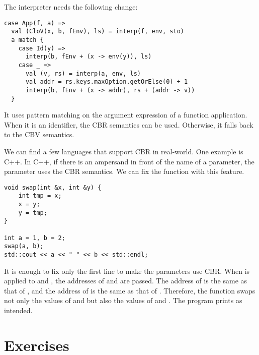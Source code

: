 The interpreter needs the following change:

\begin{verbatim}
case App(f, a) =>
  val (CloV(x, b, fEnv), ls) = interp(f, env, sto)
  a match {
    case Id(y) =>
      interp(b, fEnv + (x -> env(y)), ls)
    case _ =>
      val (v, rs) = interp(a, env, ls)
      val addr = rs.keys.maxOption.getOrElse(0) + 1
      interp(b, fEnv + (x -> addr), rs + (addr -> v))
  }
\end{verbatim}

It uses pattern matching on the argument expression of a function application.
When it is an identifier, the CBR semantics can be used. Otherwise, it falls
back to the CBV semantics.

We can find a few languages that support CBR in real-world. One example is C++.
In C++, if there is an ampersand in front of the name of a parameter,
the parameter uses the CBR semantics. We can fix the function  with
this feature.

\begin{verbatim}
void swap(int &x, int &y) {
    int tmp = x;
    x = y;
    y = tmp;
}

int a = 1, b = 2;
swap(a, b);
std::cout << a << " " << b << std::endl;
\end{verbatim}

It is enough to fix only the first line to make the parameters use CBR. When
 is applied to  and , the addresses of  and
 are passed. The address of  is the same as that of
, and the address of  is the same as that of .
Therefore, the function swaps not only the values of  and  but
also the values of  and . The program prints  as
intended.

\section{Exercises}

